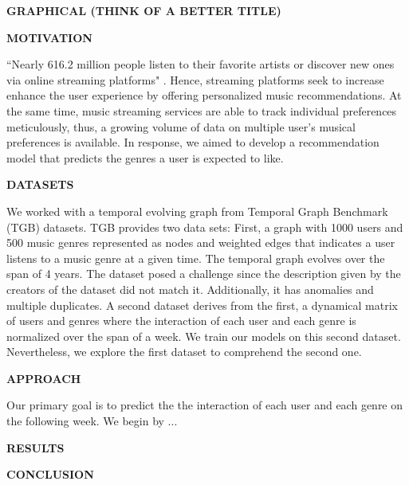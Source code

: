 \documentclass[10pt, letterpaper]{article}
\renewcommand{\title}[1]{%
	\begin{center}
		{\Large \bfseries \uppercase{#1}}
	\end{center}
}
\renewcommand{\section}[1]{%
	    \vspace{\parskip}
		{\large \bfseries\uppercase{#1}}
}
\begin{document}
	
\title{Graphical (think of a better title)}

\section{Motivation}

``Nearly 616.2 million people listen to their favorite artists or discover new ones via online streaming platforms" \cite{statista}. Hence, streaming platforms seek to increase enhance the user experience by offering personalized music recommendations. At the same time, music streaming services are able to track individual preferences meticulously, thus, a growing volume of data on  multiple user's musical preferences is available.
In response, we aimed to develop a recommendation model that predicts the genres a user is expected to like.

\section{Datasets}

We worked with a temporal evolving graph from Temporal Graph Benchmark (TGB) \cite{H:2023} datasets. TGB provides two data sets: First, a graph with 1000 users and 500 music genres represented as nodes and weighted edges that indicates a user listens to a music genre at a given time. The temporal graph evolves over the span of 4 years. The dataset posed a challenge since the description given by the creators of the dataset did not match it. Additionally, it has anomalies and multiple duplicates. A second dataset derives from the first, a dynamical matrix of users and genres where the interaction of each user and each genre is normalized over the span of a week. We train our models on this second dataset. Nevertheless, we explore the first dataset to comprehend the second one.

\section{Approach}

Our primary goal is to predict the the interaction of each user and each genre on the following week. We begin by ...

\section{Results}

\section{Conclusion}
\end{document}
